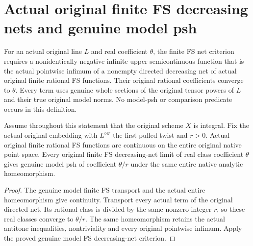 \section{Actual original finite FS decreasing nets and genuine model psh}
\label{sec:native-ample-model-psh-net-criterion}

\begin{definition}
\label{def:native-line-finite-fs-net-limit}
\leanok
{}
For an actual original line $L$ and real coefficient $\theta$, the finite FS net
criterion requires a nonidentically negative-infinite upper semicontinuous
function that is the actual pointwise infimum of a nonempty directed decreasing
net of actual original finite rational FS functions. Their original rational
coefficients converge to $\theta$. Every term uses genuine whole sections of
the original tensor powers of $L$ and their true original model norms.
No model-psh or comparison predicate occurs in this definition.
\end{definition}

\begin{theorem}
\label{thm:native-ample-model-finite-fs-net-transport}
\leanok
{}
Assume throughout this statement that the original scheme $X$ is integral.
Fix the actual original embedding with $L^{\otimes r}$ the first pulled twist
and $r>0$. Actual original finite rational FS functions are continuous on the
entire original native point space. Every original finite FS decreasing-net
limit of real class coefficient $\theta$ gives genuine model psh of coefficient
$\theta/r$ under the same entire native analytic homeomorphism.
\end{theorem}
\begin{proof}
The genuine model finite FS transport and the actual entire homeomorphism
give continuity. Transport every actual term of the original directed net.
Its rational class is divided by the same nonzero integer $r$, so these real
classes converge to $\theta/r$. The same homeomorphism retains the actual
antitone inequalities, nontriviality and every original pointwise infimum.
Apply the proved genuine model FS decreasing-net criterion.
\end{proof}

